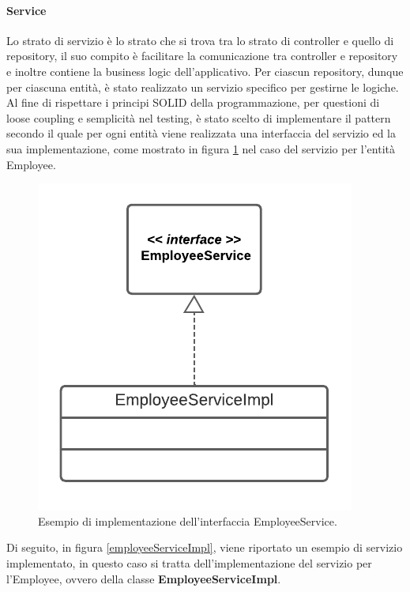 \paragraph{Service}
Lo strato di servizio è lo strato che si trova tra lo strato di controller e quello di repository, il suo compito è facilitare la comunicazione tra controller e repository e inoltre contiene la business logic dell'applicativo.
Per ciascun repository, dunque per ciascuna entità, è stato realizzato un servizio specifico per gestirne le logiche.\\
Al fine di rispettare i principi SOLID della programmazione, per questioni di loose coupling e semplicità nel testing, è stato scelto di implementare il pattern secondo il quale per ogni entità viene realizzata una interfaccia del servizio ed la sua implementazione, come mostrato in figura \ref{service-serviceImpl} nel caso del servizio per l'entità Employee.
\FloatBarrier
\begin{figure}[!ht]
\centering
\includegraphics[width=0.3\linewidth]{immagini/service_serviceImpl.pdf}
\caption{Esempio di implementazione dell'interfaccia EmployeeService.}
\label{service-serviceImpl}
\end{figure}
\FloatBarrier
Di seguito, in figura \ref{employeeServiceImpl}, viene riportato un esempio di servizio implementato, in questo caso si tratta dell'implementazione del servizio per l'Employee, ovvero della classe \textbf{EmployeeServiceImpl}.
\FloatBarrier
